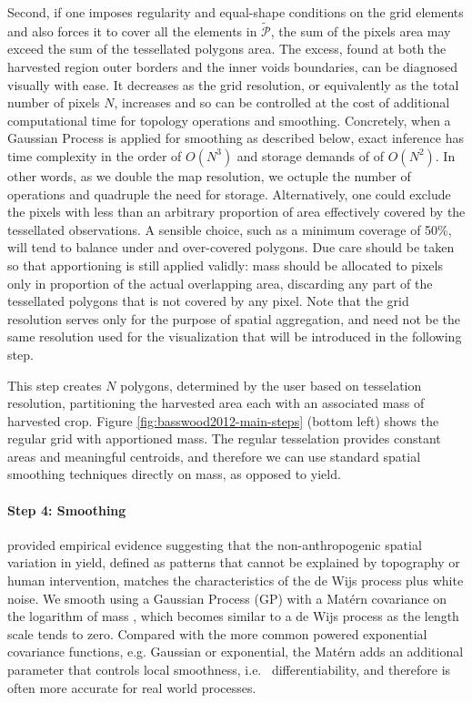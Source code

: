  Second, if one imposes regularity
and equal-shape conditions on the grid elements and also forces it to
cover all the elements in $\tilde{\mathcal{P}}$, the sum of the
pixels area may exceed the sum of the tessellated polygons area. The
excess, found at both the harvested region outer borders and the inner
voids boundaries, can be diagnosed visually with ease. It decreases as
the grid resolution, or equivalently as the total number of pixels
$N$, increases and so can be controlled at the cost of additional
computational time for topology operations and smoothing. %
Concretely, when a Gaussian Process is applied for smoothing as
described below, exact inference has time complexity in the order of
$O(N^3)$ and storage demands of of $O(N^2)$. In other words, as we
double the map resolution, we octuple the number of operations and
quadruple the need for storage.  Alternatively, one could exclude the
pixels with less than an arbitrary proportion of area effectively
covered by the tessellated observations. A sensible choice, such as a
minimum coverage of 50\%, will tend to balance under and over-covered
polygons. Due care should be taken so that apportioning is still
applied validly: mass should be allocated to pixels only in proportion
of the actual overlapping area, discarding any part of the tessellated
polygons that is not covered by any pixel. Note that the grid
resolution serves only for the purpose of spatial aggregation, and
need not be the same resolution used for the visualization that will
be introduced in the following step.

This step creates $N$ polygons, determined by the user based on
tesselation resolution, partitioning the harvested area each with an
associated mass of harvested crop. Figure
\ref{fig:basswood2012-main-steps} (bottom left) shows the regular grid
with apportioned mass. The regular tesselation provides constant areas
and meaningful centroids, and therefore we can use standard spatial
smoothing techniques directly on mass, as opposed to yield.

\paragraph{Step 4: Smoothing} \cite{McCullagh2006} provided empirical
evidence suggesting that the non-anthropogenic spatial variation in
yield, defined as patterns that cannot be explained by topography or
human intervention, matches the characteristics of the de Wijs process
plus white noise. We smooth using a Gaussian Process (GP) with a
Mat\'ern covariance on the logarithm of mass
\citep{handcock1993bayesian,gutt2006studies}, which becomes similar to
a de Wijs process as the length scale tends to zero. Compared with the
more common powered exponential covariance functions, e.g. Gaussian or
exponential, the Mat\'ern adds an additional parameter that controls
local smoothness, i.e. \ differentiability, and therefore is often
more accurate for real world processes.

